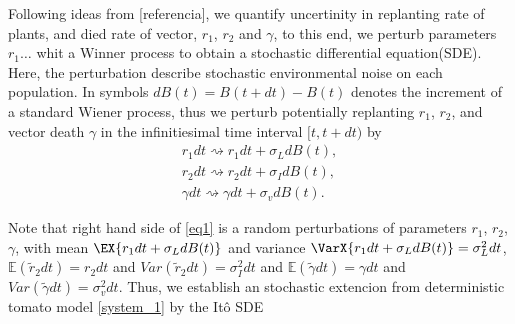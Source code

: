 	Following ideas from [referencia], we quantify uncertinity in replanting rate of
plants, and  died rate of vector, $r_1$, $r_2$ and $\gamma$, to this end, we
perturb parameters   $r_1 \dots$ whit a Winner
process to obtain a stochastic differential equation(SDE). Here, the 
perturbation describe stochastic environmental noise on each population. In
symbols $ dB(t)=B(t+dt)-B(t)$ denotes the increment of a standard Wiener
process, thus we perturb potentially replanting $r_1$, $r_2$, and vector death
$\gamma$ in the infinitiesimal time interval $[t, t + dt)$ by
\begin{equation}
	\label{eq1}
	\begin{aligned}
		{r}_1 dt \rightsquigarrow r_1 dt + \sigma_L dB(t),
		\\
		{r}_2 dt \rightsquigarrow r_2 dt + \sigma_Id B(t),
		\\
		\gamma dt \rightsquigarrow \gamma dt + \sigma_vd B(t).
	\end{aligned}
\end{equation}

	Note that right hand side of \eqref{eq1} is a random perturbations of parameters
$r_1$, $r_2$, $\gamma$, with mean
$
	\EX{r_1 dt + \sigma_L dB(t)}
$
and variance 
$
	\VarX{r_1 dt + \sigma_L dB(t)} = \sigma_L^2dt
$, 
$
	\mathbb{E}(\tilde{r}_2dt) = r_2dt
$ 
and
$
	Var(\tilde{r}_2dt) = \sigma_I^2dt
$ 
and 
$
	\mathbb{E}(\tilde{\gamma}dt) = \gamma dt
$ and 
$
	Var(\tilde{\gamma}dt) = \sigma_v^2dt
$.
%
Thus, we establish an stochastic extencion from deterministic tomato model 
\eqref{system_1} by the It\^{o} SDE

